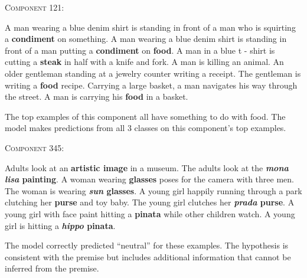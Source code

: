 \documentclass[dvipsnames]{article}
\begin{document}
\begin{figure*}[ht]
\centering
\begin{minipage}{.59\textwidth}
\begin{flushleft}

\textsc{Component 121:}\\

\begin{scriptsize}
\snlimainex
{A man wearing a blue denim shirt is standing in front of a man who is squirting a \textbf{condiment} on something.}
{A man wearing a blue denim shirt is standing in front of a man putting a \textbf{condiment} on \textbf{food}.}
% 
\snlimainex
{A man in a blue t - shirt is cutting a \textbf{steak} in half with a knife and fork.}
{A man is killing an animal.}
% 
\snlimainex
{An older gentleman standing at a jewelry counter writing a receipt.}
{The gentleman is writing a \textbf{food} recipe.}
% 
\snlimainex
{Carrying a large basket, a man navigates his way through the street.}
{A man is carrying his \textbf{food} in a basket.}
% 
\end{scriptsize}
\begin{small}{
The top examples of this component all have something to do with food.
The model makes predictions from all 3 classes on this component's top examples.} \vspace{3mm} \\
\end{small}

\textsc{Component 345:}\\
\begin{scriptsize}
\snlimainex
{Adults look at an \textbf{artistic image} in a museum.}
{The adults look at the \textbf{\textit{mona lisa} painting}.}
% 
\snlimainex
{A woman wearing \textbf{glasses} poses for the camera with three men.}
{The woman is wearing \textbf{\textit{sun} glasses}.}
% 
\snlimainex
{A young girl happily running through a park clutching her \textbf{purse} and toy baby.}
{The young girl clutches her \textbf{\textit{prada} purse}.}
% 
\snlimainex
{A young girl with face paint hitting a \textbf{pinata} while other children watch.}
{A young girl is hitting a \textbf{\textit{hippo} pinata}.}
\end{scriptsize}
\begin{small}
The model correctly predicted ``neutral'' for these examples.
The hypothesis is consistent with the premise but includes additional information that cannot be inferred from the premise.
\end{small}
\end{flushleft}
\end{minipage}%
% 
% 
% 
\begin{minipage}{.39\textwidth}
\centering


\end{minipage}
\end{figure*}
\end{document}
